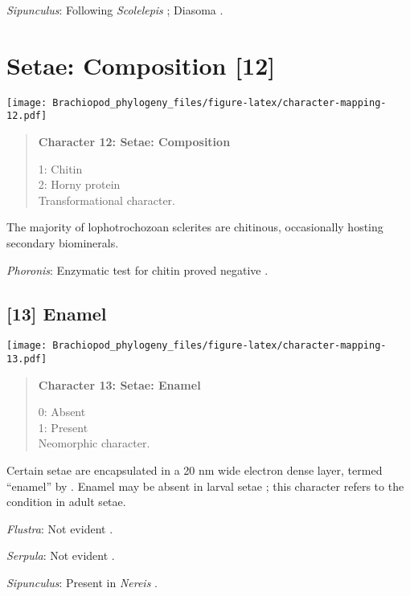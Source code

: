 \documentclass[openany]{book}
\theoremstyle{definition}
\theoremstyle{definition}
\theoremstyle{definition}
\theoremstyle{remark}
\begin{document}
\hypertarget{Sipunculus-coding-11}{}
\emph{Sipunculus}: Following \emph{Scolelepis} \citep{Hausen2005};
Diasoma \citep{Orrhage1971}.

\section{Setae: Composition {[}12{]}}\label{setae-composition-12}

\texttt{[image: Brachiopod\_phylogeny\_files/figure-latex/character-mapping-12.pdf]}

\begin{quote}
\textbf{Character 12: Setae: Composition}

1: Chitin\\
2: Horny protein\\
Transformational character.
\end{quote}

The majority of lophotrochozoan sclerites are chitinous, occasionally
hosting secondary biominerals.

\hypertarget{Phoronis-coding-12}{}
\emph{Phoronis}: Enzymatic test for chitin proved negative
\citep{Rice1993}.

\subsection*{{[}13{]} Enamel}\label{enamel}

\texttt{[image: Brachiopod\_phylogeny\_files/figure-latex/character-mapping-13.pdf]}

\begin{quote}
\textbf{Character 13: Setae: Enamel}

0: Absent\\
1: Present\\
Neomorphic character.
\end{quote}

Certain setae are encapsulated in a 20 nm wide electron dense layer,
termed ``enamel'' by \citet{Gustus1973}. Enamel may be absent in larval
setae \citep{Luter2003}; this character refers to the condition in adult
setae.

\hypertarget{Flustra-coding-13}{}
\emph{Flustra}: Not evident \citep{Gordon1975}.

\hypertarget{Serpula-coding-13}{}
\emph{Serpula}: Not evident \citep{Leise1988, Fischer1980}.

\hypertarget{Sipunculus-coding-13}{}
\emph{Sipunculus}: Present in \emph{Nereis} \citep{Gustus1973}.
\end{document}
